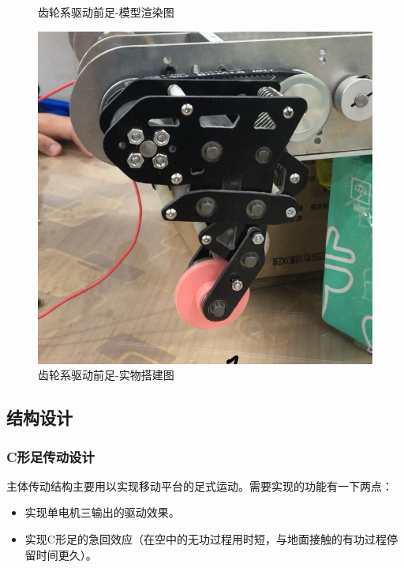 \documentclass[12pt]{article}
\begin{document}
\begin{CJK}{UTF8}{gbsn}
\begin{figure}[H]
\caption{齿轮系驱动前足-模型渲染图}
\end{figure}
\begin{figure}[H]
\centering
\includegraphics[width=.6\textwidth]{chap2//figb.jpg}
\caption{齿轮系驱动前足-实物搭建图}
\end{figure}

\subsection{结构设计}
\subsubsection{C形足传动设计}
主体传动结构主要用以实现移动平台的足式运动。需要实现的功能有一下两点：\par
\begin{itemize}
\item 实现单电机三输出的驱动效果。
\item 实现C形足的急回效应（在空中的无功过程用时短，与地面接触的有功过程停留时间更久）。
\end{itemize}


\end{CJK}
\end{document}
